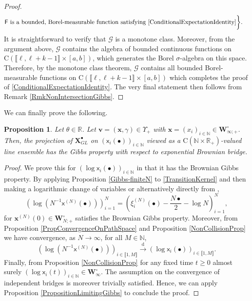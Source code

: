 \documentclass[]{article}
\newtheorem{prop}[thm]{Proposition}
\begin{document}
\begin{proof}
\begin{align*}
    &\mathsf{F} \textnormal{ is a bounded, Borel-measurable function satisfying }\eqref{ConditionalExpectationIdentity}  \bigg\}.
\end{align*}
It is straightforward to verify that \(\mathscr{G}\) is a monotone class. Moreover, from the argument above, \(\mathscr{G}\) contains the algebra of bounded continuous functions on \(\mathrm{C}\left(\llbracket \ell, \ell+k-1\rrbracket \times [a,b]\right)\), which generates the Borel \(\sigma\)-algebra on this space. Therefore, by the monotone class theorem, \(\mathscr{G}\) contains all bounded Borel-measurable functions on \(\mathrm{C}\left(\llbracket \ell, \ell+k-1\rrbracket \times [a,b]\right)\) which completes the proof of \eqref{ConditionalExpectationIdentity}. The very final statement then follows from Remark \ref{RmkNonIntersectionGibbs}.
\end{proof}


We can finally prove the following.

\begin{prop}\label{PropGibbsPropertyGL}
Let $\theta \in \mathbb{R}$. Let $\boldsymbol{v}=(\mathbf{x},\gamma)\in \Upsilon_+$ with $\mathbf{x}=(x_i)_{i\in \mathbb{N}}\in \mathbf{W}_{\infty;+}^\circ$. Then, the projection of $\mathbf{X}_{GL}^\bullet$ on $(\mathsf{x}_i(\bullet))_{i\in \mathbb{N}}$ viewed as a $\mathrm{C}(\mathbb{N}\times\mathbb{R}_+)$-valued line ensemble has the Gibbs property with respect to exponential Brownian bridge.
\end{prop}

\begin{proof}
We prove this for $(\log\mathsf{x}_i(\bullet))_{i\in \mathbb{N}}$ in that it has the Brownian Gibbs property. By applying Proposition \ref{Gibbs-finiteN} to \eqref{TransitionKernel} and then making a logarithmic change of variables or alternatively directly from \cite{JonesOConnell}, 
\begin{equation*}
(\log(N^{-1}\mathsf{x}^{(N)}(\bullet)))_{i=1}^N=\left(\xi_i^{(N)}\left(\bullet\right)-\frac{N\bullet}{2}-\log N
\right)_{i=1}^N,
\end{equation*}
for $\mathbf{x}^{(N)}(0)\in \mathbf{W}_{N;+}^{\circ}$ satisfies the Brownian Gibbs property. Moreover, from Proposition \ref{PropConvergenceOnPathSpace} and Proposition \ref{NonCollisionProp} we have convergence, as $N \to \infty$, for all $M \in \mathbb{N}$,
\begin{equation*}
(\log(N^{-1}\mathsf{x}^{(N)}(\bullet)))_{i\in \llbracket 1,M \rrbracket}\overset{\mathrm{d}}{\longrightarrow} (\log\mathsf{x}_i(\bullet))_{i\in \llbracket 1, M \rrbracket}.
\end{equation*}
 Finally, from Proposition \ref{NonCollisionProp} for any fixed time $t\ge 0$ almost surely $(\log\mathsf{x}_i(t))_{i\in \mathbb{N}}\in \mathbf{W}_\infty^\circ$. The assumption on the convergence of independent bridges is moreover trivially satisfied. Hence, we can apply Proposition \ref{PropositionLimitingGibbs} to conclude the proof. 
\end{proof}
\end{document}
